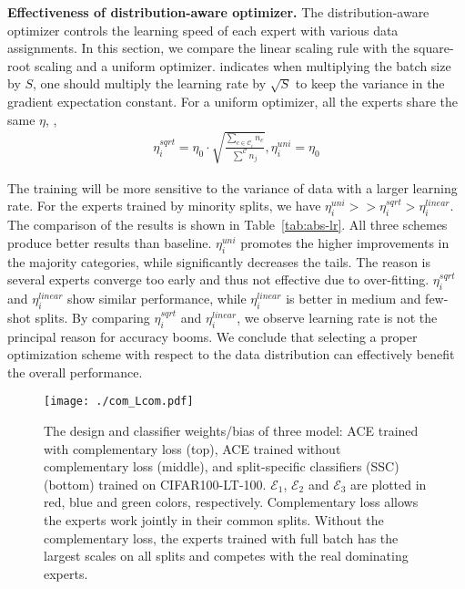 \textbf{Effectiveness of distribution-aware optimizer.} The distribution-aware optimizer controls the learning speed of each expert with various data assignments. In this section, we compare the linear scaling rule with the square-root scaling \cite{krizhevsky2014one} and a uniform optimizer. \cite{krizhevsky2014one} indicates when multiplying the batch size by $S$, one should multiply the learning rate by $\sqrt S$ to keep the variance in the gradient expectation constant. For a uniform optimizer, all the experts share the same $\eta$, \ie,
\begin{equation}
    \begin{aligned}
        \eta_i^{sqrt} = \eta_0 \cdot \sqrt {\frac{\sum_{c \in \mathcal{C}_i} {n_c}}{\sum^{\mathcal{C}} {n_j}}},
        \eta_i^{uni} = \eta_0
    \end{aligned}
\end{equation}

The training will be more sensitive to the variance of data with a larger learning rate. For the experts trained by minority splits, we have $\eta_i^{uni}>>\eta_i^{sqrt}>\eta_i^{linear}$. The comparison of the results is shown in Table~\ref{tab:abs-lr}. All three schemes produce better results than baseline. $\eta_i^{uni}$ promotes the higher improvements in the majority categories, while significantly decreases the tails. The reason is several experts converge too early and thus not effective due to over-fitting. $\eta_i^{sqrt}$ and $\eta_i^{linear}$ show similar performance, while $\eta_i^{linear}$ is better in medium and few-shot splits. By comparing $\eta_i^{sqrt}$ and $\eta_i^{linear}$, we observe learning rate is not the principal reason for accuracy booms. We conclude that selecting a proper optimization scheme with respect to the data distribution can effectively benefit the overall performance.
\begin{figure*}[t]
\begin{center}
\texttt{[image: ./com\_Lcom.pdf]}
\end{center}
   \caption{The design and classifier weights/bias of three model: ACE trained with complementary loss (top), ACE trained without complementary loss (middle), and split-specific classifiers (SSC) (bottom) trained on CIFAR100-LT-100. $\mathcal{E}_1$, $\mathcal{E}_2$ and $\mathcal{E}_3$ are plotted in red, blue and green colors, respectively. Complementary loss allows the experts work jointly in their common splits. Without the complementary loss, the experts trained with full batch has the largest scales on all splits and competes with the real dominating experts.}
\label{fig:abl-comloss}
\end{figure*}

